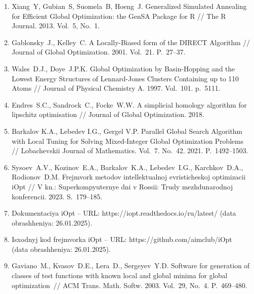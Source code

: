 \documentclass[a4paper,12pt,russian]{article}
\begin{document}
\begin{enumerate}
\item \label{rfa:enlit:dual_annealing}
Xiang~Y, Gubian~S, Suomela~B, Hoeng~J. Generalized Simulated Annealing for Efficient Global Optimization: the GenSA Package for R // The R Journal. 2013. Vol.~5, No.~1.

\item \label{rfa:enlit:direct}
Gablonsky~J., Kelley~C. A Locally-Biased form of the DIRECT Algorithm // Journal of Global Optimization. 2001. Vol.~21. P.~27--37.

\item \label{rfa:enlit:basinhopping}
Wales~D.J., Doye~J.P.K. Global Optimization by Basin-Hopping and the Lowest Energy Structures of Lennard-Jones Clusters Containing up to 110 Atoms // Journal of Physical Chemistry A. 1997. Vol.~101. p.~5111.

\item \label{rfa:enlit:shgo}
Endres~S.C., Sandrock~C., Focke~W.W. A simplicial homology algorithm for lipschitz optimisation // Journal of Global Optimization. 2018.

\item \label{rfa:enlit:Barkalov2021}
Barkalov K.A., Lebedev I.G., Gergel V.P. Parallel Global Search Algorithm with Local Tuning for Solving Mixed-Integer Global Optimization Problems // Lobachevskii Journal of Mathematics. Vol.~7. No.~42. 2021. P.~1492--1503.

\item \label{rfa:enlit:iOptPaper}
Sysoev~A.V., Kozinov~E.A., Barkalov~K.A., Lebedev~I.G., Karchkov~D.A., Rodionov~D.M. Frejmvork metodov intellektualnoj evristicheskoj optimizacii iOpt // V kn.: Superkompyuternye dni v Rossii: Trudy mezhdunarodnoj konferencii. 2023. S.~179--185.

\item \label{rfa:enlit:iOptDocs}
Dokumentaciya iOpt -- URL: https://iopt.readthedocs.io/ru/latest/ (data obrashheniya: 26.01.2025).

\item \label{rfa:enlit:iOptGithub}
Isxodnyj kod frejmvorka iOpt -- URL: https://github.com/aimclub/iOpt (data obrashheniya: 26.01.2025).

\item \label{rfa:enlit:Gaviano2003}
Gaviano~M., Kvasov~D.E., Lera~D., Sergeyev~Y.D. Software for generation of classes of test functions with known local and global minima for global optimization~// ACM Trans. Math. Softw. 2003. Vol.~29, No.~4. P.~469--480.

\end{enumerate}
\end{document}
